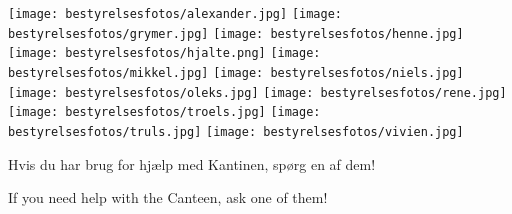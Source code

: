 \documentclass{article}
\begin{document}
\maketitle

\vspace{-0.5cm}

\english
\vspace{-18mm}
\dansk
\vspace{-10mm}

\begin{center}

\texttt{[image: bestyrelsesfotos/alexander.jpg]}
\texttt{[image: bestyrelsesfotos/grymer.jpg]}
\texttt{[image: bestyrelsesfotos/henne.jpg]}
\texttt{[image: bestyrelsesfotos/hjalte.png]}
\texttt{[image: bestyrelsesfotos/mikkel.jpg]}
\texttt{[image: bestyrelsesfotos/niels.jpg]}
\texttt{[image: bestyrelsesfotos/oleks.jpg]}
\texttt{[image: bestyrelsesfotos/rene.jpg]}
\texttt{[image: bestyrelsesfotos/troels.jpg]}
\texttt{[image: bestyrelsesfotos/truls.jpg]}
\texttt{[image: bestyrelsesfotos/vivien.jpg]}

\end{center}

\noindent Hvis du har brug for hjælp med Kantinen, spørg en af dem!

\english
If you need help with the Canteen, ask one of them!

\dansk
\underskriv
\end{document}
